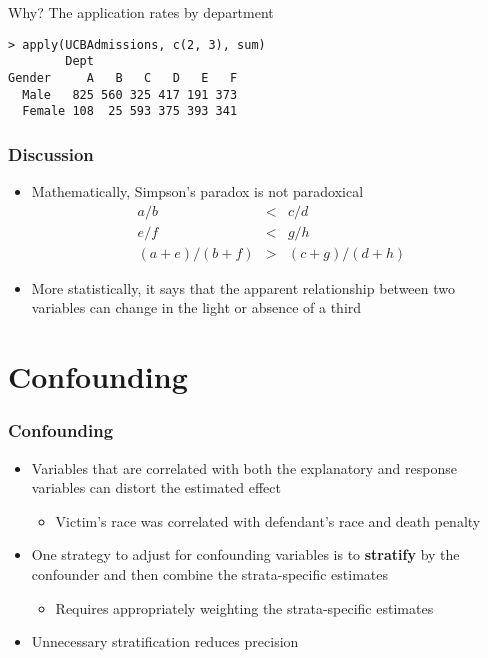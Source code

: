 \documentclass[aspectratio=169]{beamer}
\begin{document}
\begin{frame}[fragile]
Why? The application rates by department
\begin{verbatim}
> apply(UCBAdmissions, c(2, 3), sum)
        Dept
Gender     A   B   C   D   E   F
  Male   825 560 325 417 191 373
  Female 108  25 593 375 393 341
\end{verbatim}
\end{frame}

\begin{frame}\frametitle{Discussion}
\begin{itemize}
\item Mathematically, Simpson's paradox is not paradoxical
  \begin{eqnarray*}
    a / b & < & c / d\\
    e / f & < & g / h \\
    (a + e) / (b + f) & > & (c + g) / (d + h)
  \end{eqnarray*}
\item More statistically, it says that the apparent relationship between two
  variables can change in the light or absence of a third
\end{itemize}
\end{frame}

\section{Confounding}
\begin{frame}\frametitle{Confounding}
\begin{itemize}
\item Variables that are correlated with both the explanatory and response
  variables can distort the estimated effect
  \begin{itemize}
  \item Victim's race was correlated with defendant's race and death penalty
  \end{itemize}
\item One strategy to adjust for confounding variables is to {\bf stratify}
  by the confounder and then combine the strata-specific estimates
  \begin{itemize}
  \item Requires appropriately weighting the strata-specific estimates
  \end{itemize}
\item Unnecessary stratification reduces precision
\end{itemize}
\end{frame}
\end{document}
